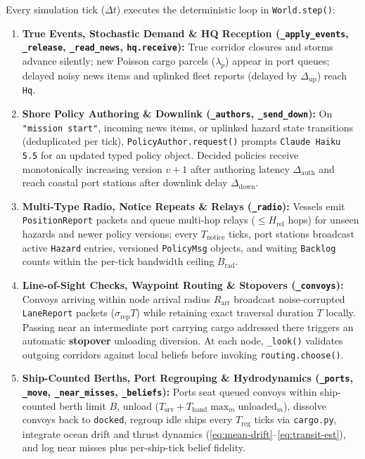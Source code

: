 \documentclass[11pt,a4paper,oneside]{report}
\begin{document}
Every simulation tick ($\Delta t$) executes the deterministic loop in \texttt{World.step()}:
\begin{sloppypar}
\begin{enumerate}
    \item \textbf{True Events, Stochastic Demand \& HQ Reception (\texttt{\_apply\_events}, \texttt{\_release}, \texttt{\_read\_news}, \texttt{hq.receive}):} True corridor closures and storms advance silently; new Poisson cargo parcels ($\lambda_p$) appear in port queues; delayed noisy news items and uplinked fleet reports (delayed by $\Delta_{\text{up}}$) reach \texttt{Hq}.
    \item \textbf{Shore Policy Authoring \& Downlink (\texttt{\_authors}, \texttt{\_send\_down}):} On \texttt{"mission start"}, incoming news items, or uplinked hazard state transitions (deduplicated per tick), \texttt{PolicyAuthor.request()} prompts \texttt{Claude Haiku 5.5} for an updated typed policy object. Decided policies receive monotonically increasing version $v+1$ after authoring latency $\Delta_{\text{auth}}$ and reach coastal port stations after downlink delay $\Delta_{\text{down}}$.
    \item \textbf{Multi-Type Radio, Notice Repeats \& Relays (\texttt{\_radio}):} Vessels emit \texttt{PositionReport} packets and queue multi-hop relays ($\le H_{\text{rel}}$ hops) for unseen hazards and newer policy versions; every $T_{\text{notice}}$ ticks, port stations broadcast active \texttt{Hazard} entries, versioned \texttt{PolicyMsg} objects, and waiting \texttt{Backlog} counts within the per-tick bandwidth ceiling $B_{\text{rad}}$.
    \item \textbf{Line-of-Sight Checks, Waypoint Routing \& Stopovers (\texttt{\_convoys}):} Convoys arriving within node arrival radius $R_{\text{arr}}$ broadcast noise-corrupted \texttt{LaneReport} packets ($\sigma_{\text{rep}} T$) while retaining exact traversal duration $T$ locally. Passing near an intermediate port carrying cargo addressed there triggers an automatic \textbf{stopover} unloading diversion. At each node, \texttt{\_look()} validates outgoing corridors against local beliefs before invoking \texttt{routing.choose()}.
    \item \textbf{Ship-Counted Berths, Port Regrouping \& Hydrodynamics (\texttt{\_ports}, \texttt{\_move}, \texttt{\_near\_misses}, \texttt{\_beliefs}):} Ports seat queued convoys within ship-counted berth limit $B$, unload ($T_{\text{srv}} + T_{\text{hand}} \max_m \text{unloaded}_m$), dissolve convoys back to \texttt{docked}, regroup idle ships every $T_{\text{reg}}$ ticks via \texttt{cargo.py}, integrate ocean drift and thrust dynamics (\autoref{eq:mean-drift}--\autoref{eq:transit-est}), and log near misses plus per-ship-tick belief fidelity.
\end{enumerate}
\end{sloppypar}
\end{document}
